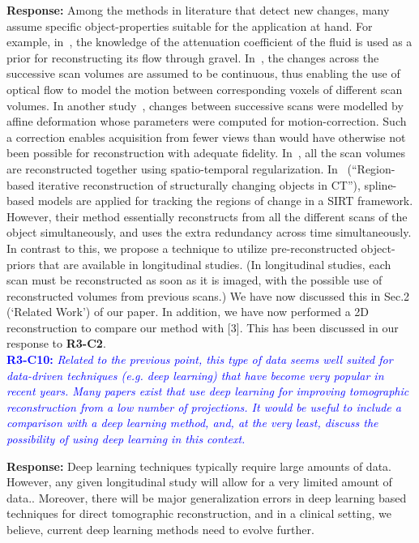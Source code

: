 \documentclass{article}
\begin{document}
\textbf{Response:} Among the methods in literature that detect new changes, many assume specific object-properties suitable for the application at hand.  For example, in~\cite{Van2015}, the knowledge of the attenuation coefficient of the fluid is used as a prior for reconstructing its flow through gravel. In~\cite{koen2020}, the changes across the successive scan volumes are assumed to be continuous, thus enabling the use of optical flow to model the motion between corresponding voxels of different scan volumes. In another study~\cite{vincent2017}, changes between successive scans were modelled by affine deformation whose parameters were computed for motion-correction. Such a correction enables acquisition from fewer views than would have otherwise not been possible for reconstruction with adequate fidelity. In~\cite{daniil2015}, all the scan volumes are reconstructed together using spatio-temporal regularization. 
In~\cite{Van2014} (``Region-based iterative reconstruction of structurally changing objects in CT''), spline-based models are applied for tracking the regions of change in a SIRT framework. However, their method essentially reconstructs from all the different scans of the object simultaneously, and uses the extra redundancy across time simultaneously. In contrast to this, we propose a technique to utilize pre-reconstructed object-priors that are available in longitudinal studies. (In longitudinal studies, each scan must be reconstructed as soon as it is imaged, with the possible use of reconstructed volumes from previous scans.) 
We have now discussed this in Sec.2 (`Related Work') of our paper.
In addition, we have now performed a 2D reconstruction to compare our method with [3]. This has been discussed in our response to \textbf{R3-C2}.\\

\textcolor{blue}{\textbf{R3-C10:}\textit{ Related to the previous point, this type of data seems well suited for data-driven techniques (e.g. deep learning) that have become very popular in recent years. Many papers exist that use deep learning for improving tomographic reconstruction from a low number of projections. It would be useful to include a comparison with a deep learning method, and, at the very least, discuss the possibility of using deep learning in this context.}}
    
\textbf{Response:} Deep learning techniques typically require large amounts of data. However, any given longitudinal study will allow for a very limited amount of data.. Moreover, there will be major generalization errors in deep learning based techniques for direct tomographic reconstruction, and in a clinical setting, we believe, current deep learning methods need to evolve further.\\
\end{document}
